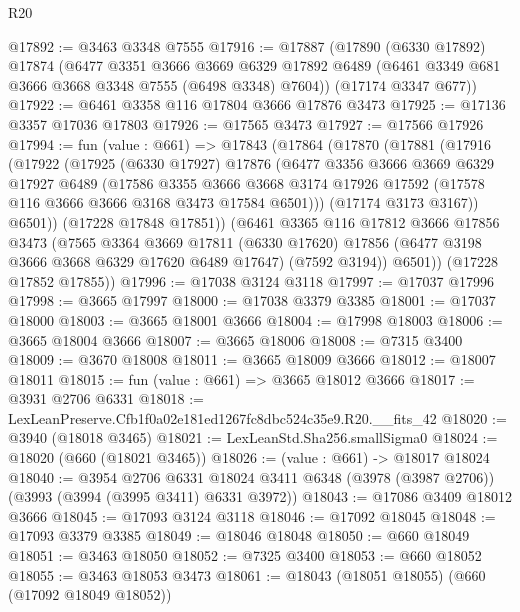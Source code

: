 \begin{lexlean}{R20}
\begin{coremodule}
@17892 := @3463 @3348 @7555
@17916 := @17887
    (@17890
      (@6330 @17892)
      @17874
      (@6477
        @3351
        @3666
        @3669
        @6329
        @17892
        @6489
        (@6461 @3349 @681 @3666 @3668 @3348 @7555 (@6498 @3348) @7604))
      (@17174 @3347 @677))
@17922 := @6461 @3358 @116 @17804 @3666 @17876 @3473
@17925 := @17136 @3357 @17036 @17803
@17926 := @17565 @3473
@17927 := @17566 @17926
@17994 := fun (value : @661) =>
  @17843
    (@17864
      (@17870
        (@17881
          (@17916
            (@17922
              (@17925
                (@6330 @17927)
                @17876
                (@6477
                  @3356
                  @3666
                  @3669
                  @6329
                  @17927
                  @6489
                  (@17586
                    @3355
                    @3666
                    @3668
                    @3174
                    @17926
                    @17592
                    (@17578 @116 @3666 @3666 @3168 @3473 @17584 @6501)))
                (@17174 @3173 @3167))
              @6501))
          (@17228 @17848 @17851))
        (@6461
          @3365
          @116
          @17812
          @3666
          @17856
          @3473
          (@7565
            @3364
            @3669
            @17811
            (@6330 @17620)
            @17856
            (@6477 @3198 @3666 @3668 @6329 @17620 @6489 @17647)
            (@7592 @3194))
          @6501))
      (@17228 @17852 @17855))
@17996 := @17038 @3124 @3118
@17997 := @17037 @17996
@17998 := @3665 @17997
@18000 := @17038 @3379 @3385
@18001 := @17037 @18000
@18003 := @3665 @18001 @3666
@18004 := @17998 @18003
@18006 := @3665 @18004 @3666
@18007 := @3665 @18006
@18008 := @7315 @3400
@18009 := @3670 @18008
@18011 := @3665 @18009 @3666
@18012 := @18007 @18011
@18015 := fun (value : @661) => @3665 @18012 @3666
@18017 := @3931 @2706 @6331
@18018 := LexLeanPreserve.Cfb1f0a02e181ed1267fc8dbc524c35e9.R20.__fits_42
@18020 := @3940 (@18018 @3465)
@18021 := LexLeanStd.Sha256.smallSigma0
@18024 := @18020 (@660 (@18021 @3465))
@18026 := (value : @661) -> @18017 @18024
@18040 := @3954
    @2706
    @6331
    @18024
    @3411
    @6348
    (@3978 (@3987 @2706))
    (@3993 (@3994 (@3995 @3411) @6331 @3972))
@18043 := @17086 @3409 @18012 @3666
@18045 := @17093 @3124 @3118
@18046 := @17092 @18045
@18048 := @17093 @3379 @3385
@18049 := @18046 @18048
@18050 := @660 @18049
@18051 := @3463 @18050
@18052 := @7325 @3400
@18053 := @660 @18052
@18055 := @3463 @18053 @3473
@18061 := @18043 (@18051 @18055) (@660 (@17092 @18049 @18052))

\end{coremodule}
\end{lexlean}
